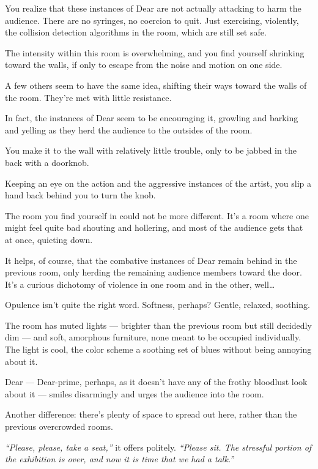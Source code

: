 You realize that these instances of Dear are not actually attacking to harm the audience. There are no syringes, no coercion to quit. Just exercising, violently, the collision detection algorithms in the room, which are still set safe.

The intensity within this room is overwhelming, and you find yourself shrinking toward the walls, if only to escape from the noise and motion on one side.

A few others seem to have the same idea, shifting their ways toward the walls of the room. They're met with little resistance.

In fact, the instances of Dear seem to be encouraging it, growling and barking and yelling as they herd the audience to the outsides of the room.

You make it to the wall with relatively little trouble, only to be jabbed in the back with a doorknob.

Keeping an eye on the action and the aggressive instances of the artist, you slip a hand back behind you to turn the knob.

\newpage

The room you find yourself in could not be more different. It's a room where one might feel quite bad shouting and hollering, and most of the audience gets that at once, quieting down.

It helps, of course, that the combative instances of Dear remain behind in the previous room, only herding the remaining audience members toward the door. It's a curious dichotomy of violence in one room and in the other, well\ldots{}

Opulence isn't quite the right word. Softness, perhaps? Gentle, relaxed, soothing.

The room has muted lights --- brighter than the previous room but still decidedly dim --- and soft, amorphous furniture, none meant to be occupied individually. The light is cool, the color scheme a soothing set of blues without being annoying about it.

Dear --- Dear-prime, perhaps, as it doesn't have any of the frothy bloodlust look about it --- smiles disarmingly and urges the audience into the room.

Another difference: there's plenty of space to spread out here, rather than the previous overcrowded rooms.

\emph{``Please, please, take a seat,''} it offers politely. \emph{``Please sit. The stressful portion of the exhibition is over, and now it is time that we had a talk.''}


